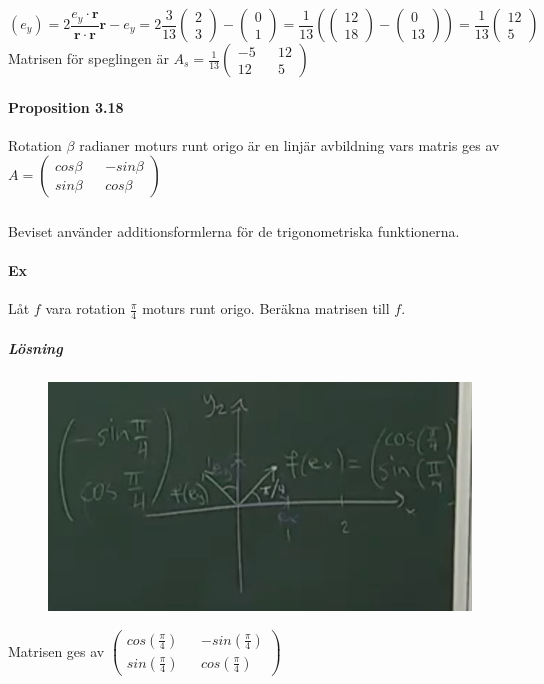 \begin{equation*}
    (e_{y})=2\frac{e_{y}\cdot \bm{r}}{\bm{r}\cdot \bm{r}}\bm{r} - e_{y}=2\frac{3}{13}\begin{pmatrix}2\\3\end{pmatrix}-\begin{pmatrix}0\\1\end{pmatrix}=
    \frac{1}{13}(\begin{pmatrix}12\\18\end{pmatrix}-\begin{pmatrix}0\\13\end{pmatrix})=\frac{1}{13}\begin{pmatrix}12\\5\end{pmatrix}
\end{equation*}
Matrisen för speglingen är $A_{s}=\frac{1}{13}\begin{pmatrix}-5&&12\\12&&5\end{pmatrix}$

\paragraph{Proposition 3.18} Rotation $\beta$ radianer moturs runt origo är en linjär avbildning vars matris ges av
$A=\begin{pmatrix}
    cos\beta && -sin\beta\\sin\beta && cos\beta
\end{pmatrix}$
\subparagraph{} Beviset använder additionsformlerna för de trigonometriska funktionerna.

\paragraph{Ex} Låt $f$ vara rotation $\frac{\pi}{4}$ moturs runt origo.
Beräkna matrisen till $f$.
\subparagraph{Lösning} 
\begin{figure}[h]
    \includegraphics[scale=0.3]{imgs/img04.png}
\end{figure}
Matrisen ges av $\begin{pmatrix}
    cos(\frac{\pi}{4}) && -sin(\frac{\pi}{4})\\sin(\frac{\pi}{4}) && cos(\frac{\pi}{4})
\end{pmatrix}$


